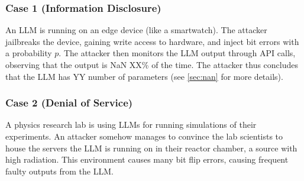 \subsubsection{Case 1 (Information Disclosure)} An LLM is running on an edge device (like a smartwatch). The attacker jailbreaks the device, gaining write access to hardware, and inject bit errors with a probability $p$. The attacker then monitors the LLM output through API calls, observing that the output is NaN XX\% of the time. The attacker thus concludes that the LLM has YY number of parameters (see \ref{sec:nan} for more details).

\subsubsection{Case 2 (Denial of Service)} A physics research lab is using LLMs for running simulations of their experiments. An attacker somehow manages to convince the lab scientists to house the servers the LLM is running on in their reactor chamber, a source with high radiation. This environment causes many bit flip errors, causing frequent faulty outputs from the LLM.

